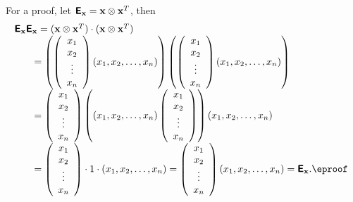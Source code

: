 {\color{OliveGreen}
\bproof
For a proof, let $\textsf{\textbf{E}}_{\bf x} = {\bf x}\otimes {\bf x}^T $,
then
$$
\begin{array}{l}
\textsf{\textbf{E}}_{\bf x}\textsf{\textbf{E}}_{\bf x}
= ({\bf x}\otimes {\bf x}^T ) \cdot ({\bf x}\otimes {\bf x}^T )
\\
\qquad
=
\left(
\left(
\begin{array}{c}
x_1\\
x_2\\
\vdots \\
x_n
\end{array}
\right)
(x_1,x_2,\ldots ,x_n) \right) \left(
\left(
\begin{array}{c}
x_1\\
x_2\\
\vdots \\
x_n
\end{array}
\right)
(x_1,x_2,\ldots ,x_n)
 \right)
\\
\qquad
=
\left(
\begin{array}{c}
x_1\\
x_2\\
\vdots \\
x_n
\end{array}
\right)
\left(
(x_1,x_2,\ldots ,x_n)
\left(
\begin{array}{c}
x_1\\
x_2\\
\vdots \\
x_n
\end{array}
\right)
 \right)
(x_1,x_2,\ldots ,x_n)
\\
\qquad
=
\left(
\begin{array}{c}
x_1\\
x_2\\
\vdots \\
x_n
\end{array}
\right)
\cdot 1 \cdot
(x_1,x_2,\ldots ,x_n)
=
\left(
\begin{array}{c}
x_1\\
x_2\\
\vdots \\
x_n
\end{array}
\right)
(x_1,x_2,\ldots ,x_n)
=\textsf{\textbf{E}}_{\bf x}. \textrm{\eproof }
\end{array}
$$
}

